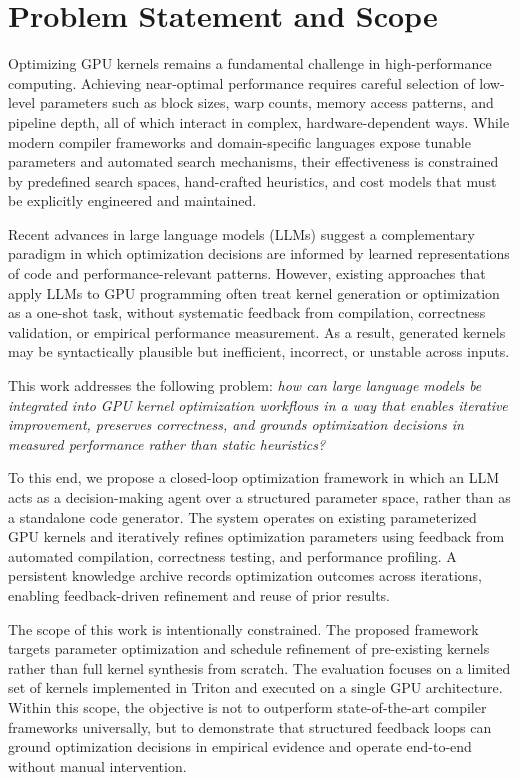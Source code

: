 \documentclass{article}
\begin{document}
\section{Problem Statement and Scope}

Optimizing GPU kernels remains a fundamental challenge in high-performance computing. Achieving near-optimal performance requires careful selection of low-level parameters such as block sizes, warp counts, memory access patterns, and pipeline depth, all of which interact in complex, hardware-dependent ways. While modern compiler frameworks and domain-specific languages expose tunable parameters and automated search mechanisms, their effectiveness is constrained by predefined search spaces, hand-crafted heuristics, and cost models that must be explicitly engineered and maintained.

Recent advances in large language models (LLMs) suggest a complementary paradigm in which optimization decisions are informed by learned representations of code and performance-relevant patterns. However, existing approaches that apply LLMs to GPU programming often treat kernel generation or optimization as a one-shot task, without systematic feedback from compilation, correctness validation, or empirical performance measurement. As a result, generated kernels may be syntactically plausible but inefficient, incorrect, or unstable across inputs.

This work addresses the following problem: \emph{how can large language models be integrated into GPU kernel optimization workflows in a way that enables iterative improvement, preserves correctness, and grounds optimization decisions in measured performance rather than static heuristics?}

To this end, we propose a closed-loop optimization framework in which an LLM acts as a decision-making agent over a structured parameter space, rather than as a standalone code generator. The system operates on existing parameterized GPU kernels and iteratively refines optimization parameters using feedback from automated compilation, correctness testing, and performance profiling. A persistent knowledge archive records optimization outcomes across iterations, enabling feedback-driven refinement and reuse of prior results.

The scope of this work is intentionally constrained. The proposed framework targets parameter optimization and schedule refinement of pre-existing kernels rather than full kernel synthesis from scratch. The evaluation focuses on a limited set of kernels implemented in Triton and executed on a single GPU architecture. Within this scope, the objective is not to outperform state-of-the-art compiler frameworks universally, but to demonstrate that structured feedback loops can ground optimization decisions in empirical evidence and operate end-to-end without manual intervention.
\end{document}
